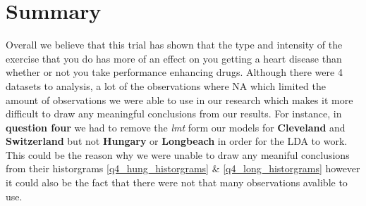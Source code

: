 \documentclass[a4paper]{article}
\begin{document}
\section{Summary}
Overall we believe that this trial has shown that the type and intensity of the
exercise that you do has more of an effect on you getting a heart disease than
whether or not you take performance enhancing drugs. Although there were 4
datasets to analysis, a lot of the observations where NA which limited the
amount of observations we were able to use in our research which makes it more
difficult to draw any meaningful conclusions from our results. For instance,
in \textbf{question four} we had to remove the \textit{lmt} form our models for
\textbf{Cleveland} and \textbf{Switzerland} but not \textbf{Hungary} or
\textbf{Longbeach} in order for the LDA to work. This could be the reason why we
were unable to draw any meaniful conclusions from their historgrams
\ref{q4_hung_historgrams} \& \ref{q4_long_historgrams} however it could also be
the fact that there were not that many observations avalible to use.
\end{document}
